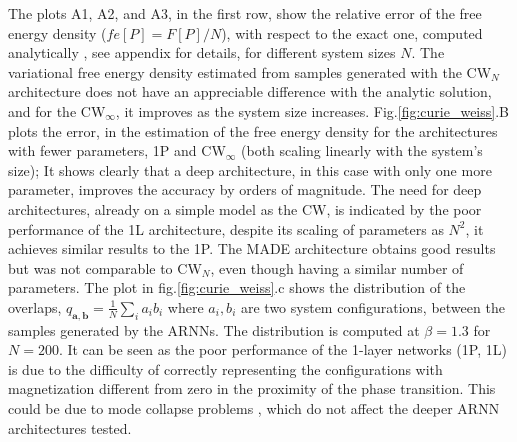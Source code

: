 \documentclass[aps,physrev,10pt,floatfix,reprint]{revtex4-2}
\begin{document}
The plots A1, A2, and A3, in the first row, show the relative error of the free energy density ($fe[P] = F[P]/N$), with respect to the exact one, computed analytically \cite{kadanoff2000statistical}, see appendix for details, for different system sizes $N$.  
The variational free energy density estimated from samples generated with the CW$_N$ architecture does not have an appreciable difference with the analytic solution, and for the CW$_{\infty}$, it improves as the system size increases. Fig.\ref{fig:curie_weiss}.B plots the error, in the estimation of the free energy density for the architectures with fewer parameters, 1P and CW$_{\infty}$ (both scaling linearly with the system's size); It shows clearly that a deep architecture, in this case with only one more parameter, improves the accuracy by orders of magnitude. The need for deep architectures, already on a simple model as the CW, is indicated by the poor performance of the 1L architecture, despite its scaling of parameters as $N^2$, it achieves similar results to the 1P. The MADE architecture obtains good results but was not comparable to CW$_N$, even though having a similar number of parameters. The plot in fig.\ref{fig:curie_weiss}.c shows the distribution of the overlaps, $q_{\mathbf{a}, \mathbf{b}}=\frac{1}{N}\sum_{i} a_i b_i$ where $a_i, b_i$ are two system configurations, between the samples generated by the ARNNs. The distribution is computed at $\beta=1.3$ for $N=200$. It can be seen as the poor performance of the 1-layer networks (1P, 1L) is due to the difficulty of correctly representing the configurations with magnetization different from zero in the proximity of the phase transition. This could be due to mode collapse problems \cite{https://doi.org/10.48550/arxiv.2210.11145}, which do not affect the deeper ARNN architectures tested.
\end{document}
